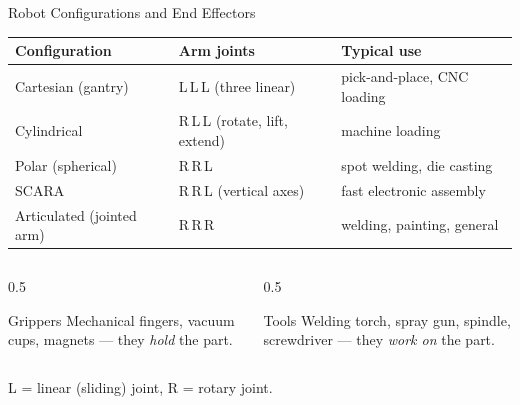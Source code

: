 \documentclass[aspectratio=169]{beamer}
\begin{document}
	\begin{frame}{Robot Configurations and End Effectors}
		\renewcommand{\arraystretch}{1.25}
		\centering
		\small
		\begin{tabular}{@{}lll@{}}
			\toprule
			\textbf{Configuration} & \textbf{Arm joints} & \textbf{Typical use} \\
			\midrule
			Cartesian (gantry)   & L\,L\,L (three linear)                & pick-and-place, CNC loading \\
			Cylindrical          & R\,L\,L (rotate, lift, extend)        & machine loading \\
			Polar (spherical)    & R\,R\,L                               & spot welding, die casting \\
			SCARA                & R\,R\,L (vertical axes)               & fast electronic assembly \\
			Articulated (jointed arm) & R\,R\,R                          & welding, painting, general \\
			\bottomrule
		\end{tabular}
		\vspace{0.3cm}
		\begin{columns}[T]
			\begin{column}{0.5\textwidth}
				\begin{block}{Grippers}
					\small Mechanical fingers, vacuum cups, magnets --- they \emph{hold} the part.
				\end{block}
			\end{column}
			\begin{column}{0.5\textwidth}
				\begin{block}{Tools}
					\small Welding torch, spray gun, spindle, screwdriver --- they \emph{work on} the part.
				\end{block}
			\end{column}
		\end{columns}
		\vspace{0.1cm}
		\footnotesize\centering L = linear (sliding) joint, \; R = rotary joint.
	\end{frame}

\end{document}
